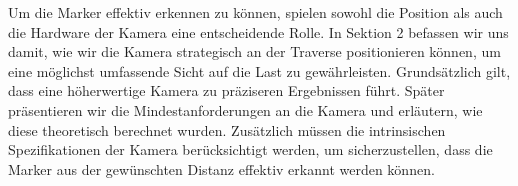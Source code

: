 Um die Marker effektiv erkennen zu können, spielen sowohl die Position als auch die Hardware der Kamera eine entscheidende Rolle. In Sektion 2 befassen wir uns damit, wie wir die Kamera strategisch an der Traverse positionieren können, um eine möglichst umfassende Sicht auf die Last zu gewährleisten. Grundsätzlich gilt, dass eine höherwertige Kamera zu präziseren Ergebnissen führt. Später präsentieren wir die Mindestanforderungen an die Kamera und erläutern, wie diese theoretisch berechnet wurden. Zusätzlich müssen die intrinsischen Spezifikationen der Kamera berücksichtigt werden, um sicherzustellen, dass die Marker aus der gewünschten Distanz effektiv erkannt werden können.